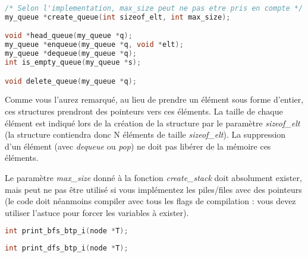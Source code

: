 \documentclass[11pt,a4paper]{article}
\begin{document}
\begin{lstlisting}[language=C]
/* Selon l'implementation, max_size peut ne pas etre pris en compte */
my_queue *create_queue(int sizeof_elt, int max_size);

void *head_queue(my_queue *q);
my_queue *enqueue(my_queue *q, void *elt);
my_queue *dequeue(my_queue *q);
int is_empty_queue(my_queue *s);

void delete_queue(my_queue *q); \end{lstlisting}

\vspace*{-0.5cm}

Comme vous l'aurez remarqué, au lieu de prendre un élément sous forme d'entier, ces structures prendront des pointeurs vers ces éléments.
La taille de chaque élément est indiqué lors de la création de la structure par le paramètre \textit{sizeof\_elt} (la structure contiendra donc N éléments de taille \textit{sizeof\_elt}).
La suppression d'un élément (avec \textit{dequeue} ou \textit{pop}) ne doit pas libérer de la mémoire ces éléments.

Le paramètre \textit{max\_size} donné à la fonction \textit{create\_stack} doit absolument exister, mais peut ne pas être utilisé si vous implémentez les piles/files avec des pointeurs (le code doit néanmoins compiler avec tous les flags de compilation : vous devez utiliser l'astuce pour forcer les variables à exister).


\bigskip


\begin{lstlisting}[language=C]
int print_bfs_btp_i(node *T); \end{lstlisting}


\vspace*{-0.5cm}



\begin{lstlisting}[language=C]
int print_dfs_btp_i(node *T); \end{lstlisting}

%
\end{document}

